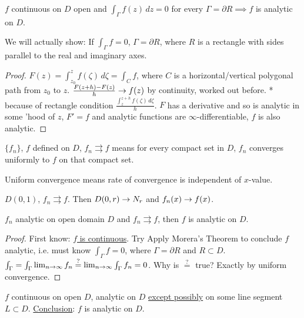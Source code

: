 \documentclass[]{article}
\begin{document}
\begin{theorem}
	 $f$ continuous on $D$ open and $\int_{\Gamma} f(z) \, dz = 0$ for every $\Gamma = \partial R \implies f$ is analytic on $D$.
\end{theorem}
\begin{remark}
	We will actually show: If $\int_{\Gamma} f = 0$, $\Gamma = \partial R$, where $R$ is a rectangle with sides parallel to the real and imaginary axes.
\end{remark}
\begin{proof}
	$F(z) = \int_{z_0}^z f(\zeta) \, d\zeta = \int_C f$, where $C$ is a horizontal/vertical polygonal path from $z_0$ to $z$.
	$\frac{F(z+h)-F(z)}{h} \rightarrow f(z)$ by continuity, worked out before. * because of rectangle condition $\frac{\int_z^{z+h} f(\zeta)\, d\zeta}{h}$. $F$ has a derivative and so is analytic in some 'hood of $z$, $F'=f$ and analytic functions are $\infty$-differentiable, $f$ is also analytic.
\end{proof}
\begin{definition}
	$\{f_n\}$, $f$ defined on $D$, $f_n \rightrightarrows f$  means for every compact set in $D$, $f_n$ converges uniformly to $f$ on that compact set.
\end{definition}
\begin{recall}
	Uniform convergence means rate of convergence is independent of $x$-value.
\end{recall}
\begin{example}
	$D(0,1)$, $f_n \rightrightarrows f$. Then $D(0,r) \rightarrow N_r$ and $f_n(x) \rightarrow f(x)$.
\end{example}
\begin{theorem}
	$f_n$ analytic on open domain $D$ and $f_n \rightrightarrows f$, then $f$ is analytic on $D$.
\end{theorem}
\begin{proof}
	First know: \underline{$f$ is continuous}. Try Apply Morera's Theorem to conclude $f$ analytic, i.e. must know $\int_{\Gamma} f = 0$, where $\Gamma = \partial R$ and $R\subset D$. $\int_{\Gamma} = \int_{\Gamma} \lim_{n\rightarrow \infty} f_n \overset{?}{=} \lim_{n\rightarrow\infty} \int_{\Gamma} f_n = 0$. Why is $\overset{?}{=}$ true? Exactly by uniform convergence.
\end{proof}
\begin{theorem}
	$f$ continuous on open $D$, analytic on $D$ \underline{except possibly} on some line segment $L\subset D$. \underline{Conclusion}: $f$ is analytic on $D$.
\end{theorem}
\end{document}
